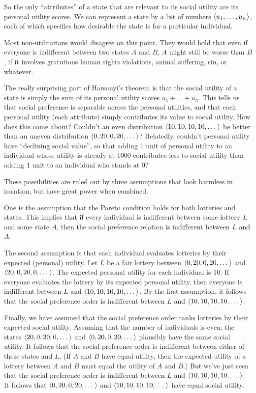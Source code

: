 So the only ``attributes'' of a state that are relevant to its social utility
are its personal utility scores. We can represent a state by a list of numbers
$\t{u_{1}, \ldots, u_{n} }$, each of which specifies how desirable the state is
for a particular individual.

Most non-utilitarians would disagree on this point. They would hold that even if
everyone is indifferent between two states $A$ and $B$, $A$ might still be worse
than $B$, if it involves gratuitous human rights violations, animal suffering,
sin, or whatever.

The really surprising part of Harsanyi's theorem is that the social utility of a
state is simply the sum of its personal utility scores $u_{1} + \ldots + u_{n}$.
This tells us that social preference is separable across the personal utilities,
and that each personal utility (each attribute) simply contributes its value to
social utility. How does this come about? Couldn't an even distribution
$\t{10,10,10,10,\ldots }$ be better than an uneven distribution
$\t{0,20,0,20,\ldots}$? Relatedly, couldn't personal utility have ``declining
social value'', so that adding 1 unit of personal utility to an individual whose
utility is already at 1000 contributes less to social utility than adding 1 unit
to an individual who stands at 0?

These possibilities are ruled out by three assumptions that look harmless in
isolation, but have great power when combined.

One is the assumption that the Pareto condition holds for both lotteries and
states. This implies that if every individual is indifferent between some
lottery $L$ and some state $A$, then the social preference relation is
indifferent between $L$ and $A$.

The second assumption is that each individual evaluates lotteries by their
expected (personal) utility. Let $L$ be a fair lottery between
$\t{0,20,0,20,\ldots}$ and $\t{20,0,20,0,\ldots }$. The expected personal utility
for each individual is 10. If everyone evaluates the lottery by its expected
personal utility, then everyone is indifferent between $L$ and
$\t{10,10,10,10,\ldots}$. By the first assumption, it follows that the social
preference order is indifferent between $L$ and $\t{10,10,10,10,\ldots}$.

Finally, we have assumed that the social preference order ranks lotteries by
their expected social utility. Assuming that the number of individuals is even,
the states $\t{20,0,20,0,\ldots}$ and $\t{0,20,0,20,\ldots }$ plausibly
have the same social utility. It follows that the social preference order is
indifferent between either of these states and $L$. (If $A$ and $B$ have equal
utility, then the expected utility of a lottery between $A$ and $B$ must equal
the utility of $A$ and $B$.) But we've just seen that the social preference
order is indifferent between $L$ and $\t{10,10,10,10,\ldots}$. It follows that
$\t{0,20,0,20,\ldots}$ and $\t{10,10,10,10,\ldots}$ have equal social utility.

